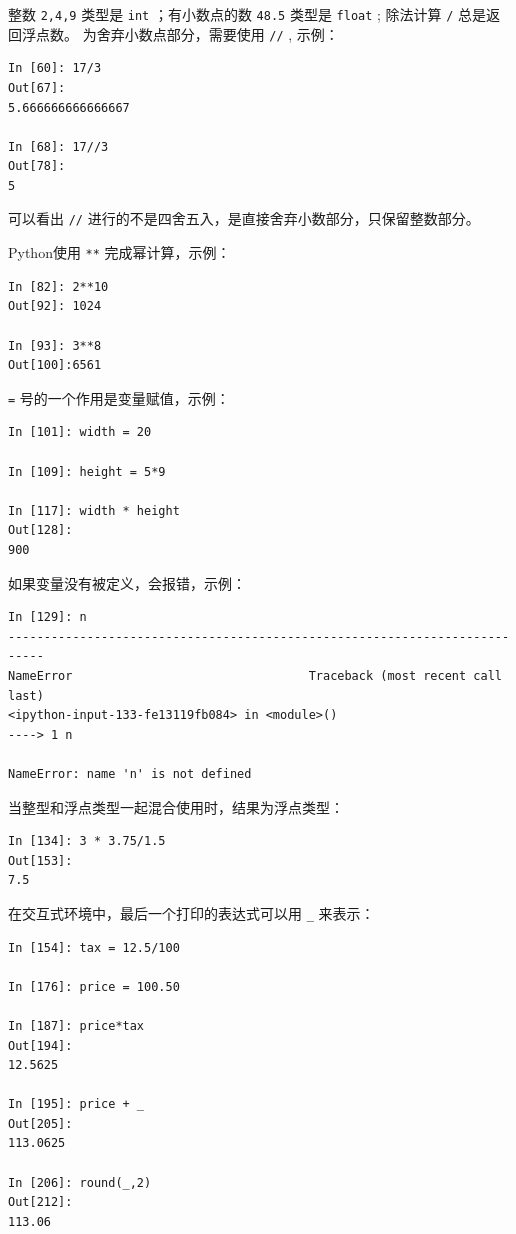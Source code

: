 \documentclass[10pt,a4paper,UTF8]{article}
\begin{document}
整数 \texttt{2,4,9} 类型是 \texttt{int} ；有小数点的数 \texttt{48.5} 类型是 \texttt{float} ; 除法计算 \texttt{/} 总是返回浮点数。 为舍弃小数点部分，需要使用 \texttt{//} , 示例：
\lstset{language=Python,label= ,caption= ,captionpos=b,numbers=none}
\begin{lstlisting}
In [60]: 17/3
Out[67]: 
5.666666666666667

In [68]: 17//3
Out[78]: 
5
\end{lstlisting}

可以看出 \texttt{//} 进行的不是四舍五入，是直接舍弃小数部分，只保留整数部分。

Python使用 \texttt{**} 完成幂计算，示例：
\lstset{language=Python,label= ,caption= ,captionpos=b,numbers=none}
\begin{lstlisting}
In [82]: 2**10
Out[92]: 1024

In [93]: 3**8
Out[100]:6561
\end{lstlisting}

\texttt{=} 号的一个作用是变量赋值，示例：
\lstset{language=Python,label= ,caption= ,captionpos=b,numbers=none}
\begin{lstlisting}
In [101]: width = 20

In [109]: height = 5*9

In [117]: width * height
Out[128]: 
900
\end{lstlisting}
如果变量没有被定义，会报错，示例：
\lstset{language=Python,label= ,caption= ,captionpos=b,numbers=none}
\begin{lstlisting}
In [129]: n
---------------------------------------------------------------------------
NameError                                 Traceback (most recent call last)
<ipython-input-133-fe13119fb084> in <module>()
----> 1 n

NameError: name 'n' is not defined
\end{lstlisting}

当整型和浮点类型一起混合使用时，结果为浮点类型：
\lstset{language=Python,label= ,caption= ,captionpos=b,numbers=none}
\begin{lstlisting}
In [134]: 3 * 3.75/1.5
Out[153]: 
7.5
\end{lstlisting}
在交互式环境中，最后一个打印的表达式可以用 \texttt{\_} 来表示：
\lstset{language=Python,label= ,caption= ,captionpos=b,numbers=none}
\begin{lstlisting}
In [154]: tax = 12.5/100

In [176]: price = 100.50

In [187]: price*tax
Out[194]: 
12.5625

In [195]: price + _
Out[205]: 
113.0625

In [206]: round(_,2)
Out[212]: 
113.06
\end{lstlisting}
\end{document}
